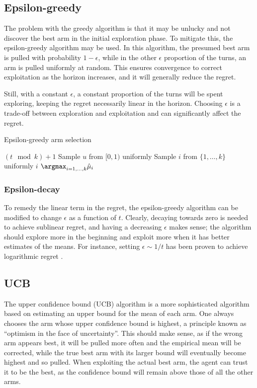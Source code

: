\subsection{Epsilon-greedy}
The problem with the greedy algorithm is that it may be unlucky and not discover the best arm in the initial exploration phase.
To mitigate this, the epsilon-greedy algorithm may be used.
In this algorithm, the presumed best arm is pulled with probability $1-\epsilon$, while in the other $\epsilon$ proportion of the turns, an arm is pulled uniformly at random.
This ensures convergence to correct exploitation as the horizon increases, and it will generally reduce the regret.

Still, with a constant $\epsilon$, a constant proportion of the turns will be spent exploring, keeping the regret necessarily linear in the horizon.
Choosing $\epsilon$ is a trade-off between exploration and exploitation and can significantly affect the regret.

\begin{algorithm}
    \caption{Epsilon-greedy arm selection}
    \label{alg:eps_greedy}
    \begin{algorithmic}
        \State \Return $(t \mod k) + 1$
        \Else
        \State Sample $u$ from $[0,1)$ uniformly
        \State Sample $i$ from $\{1,\dots, k\}$ uniformly
        \State \Return $i$
        \Else
        \State \Return $\argmax_{i=1,\dots,k} \hat{\mu}_i$
        \EndIf
        \EndIf
    \end{algorithmic}
\end{algorithm}


\subsubsection{Epsilon-decay}
To remedy the linear term in the regret, the epsilon-greedy algorithm can be modified to change $\epsilon$ as a function of $t$.
Clearly, decaying towards zero is needed to achieve sublinear regret, and having a decreasing $\epsilon$ makes sense; the algorithm should explore more in the beginning and exploit more when it has better estimates of the means.
For instance, setting $\epsilon \sim 1/t$ has been proven to achieve logarithmic regret \cite{auer2002}.

\subsection{UCB}
The upper confidence bound (UCB) algorithm is a more sophisticated algorithm based on estimating an upper bound for the mean of each arm.
One always chooses the arm whose upper confidence bound is highest, a principle known as \enquote{optimism in the face of uncertainty}.
This should make sense, as if the wrong arm appears best, it will be pulled more often and the empirical mean will be corrected, while the true best arm with its larger bound will eventually become highest and so pulled.
When exploiting the actual best arm, the agent can trust it to be the best, as the confidence bound will remain above those of all the other arms.

